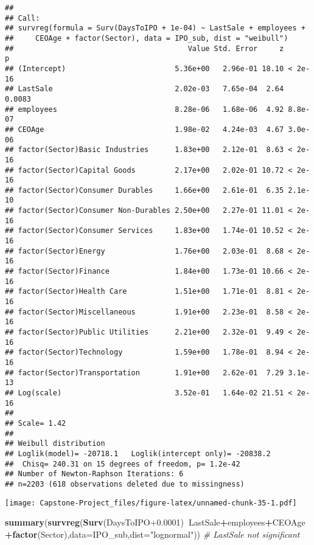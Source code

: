 \documentclass[]{article}
\newenvironment{Shaded}{\begin{snugshade}}{\end{snugshade}}
\newcommand{\CommentTok}[1]{\textcolor[rgb]{0.56,0.35,0.01}{\textit{#1}}}
\newcommand{\DataTypeTok}[1]{\textcolor[rgb]{0.13,0.29,0.53}{#1}}
\newcommand{\FloatTok}[1]{\textcolor[rgb]{0.00,0.00,0.81}{#1}}
\newcommand{\KeywordTok}[1]{\textcolor[rgb]{0.13,0.29,0.53}{\textbf{#1}}}
\newcommand{\NormalTok}[1]{#1}
\newcommand{\OperatorTok}[1]{\textcolor[rgb]{0.81,0.36,0.00}{\textbf{#1}}}
\newcommand{\StringTok}[1]{\textcolor[rgb]{0.31,0.60,0.02}{#1}}
\begin{document}
\begin{verbatim}
## 
## Call:
## survreg(formula = Surv(DaysToIPO + 1e-04) ~ LastSale + employees + 
##     CEOAge + factor(Sector), data = IPO_sub, dist = "weibull")
##                                        Value Std. Error     z       p
## (Intercept)                         5.36e+00   2.96e-01 18.10 < 2e-16
## LastSale                            2.02e-03   7.65e-04  2.64  0.0083
## employees                           8.28e-06   1.68e-06  4.92 8.8e-07
## CEOAge                              1.98e-02   4.24e-03  4.67 3.0e-06
## factor(Sector)Basic Industries      1.83e+00   2.12e-01  8.63 < 2e-16
## factor(Sector)Capital Goods         2.17e+00   2.02e-01 10.72 < 2e-16
## factor(Sector)Consumer Durables     1.66e+00   2.61e-01  6.35 2.1e-10
## factor(Sector)Consumer Non-Durables 2.50e+00   2.27e-01 11.01 < 2e-16
## factor(Sector)Consumer Services     1.83e+00   1.74e-01 10.52 < 2e-16
## factor(Sector)Energy                1.76e+00   2.03e-01  8.68 < 2e-16
## factor(Sector)Finance               1.84e+00   1.73e-01 10.66 < 2e-16
## factor(Sector)Health Care           1.51e+00   1.71e-01  8.81 < 2e-16
## factor(Sector)Miscellaneous         1.91e+00   2.23e-01  8.58 < 2e-16
## factor(Sector)Public Utilities      2.21e+00   2.32e-01  9.49 < 2e-16
## factor(Sector)Technology            1.59e+00   1.78e-01  8.94 < 2e-16
## factor(Sector)Transportation        1.91e+00   2.62e-01  7.29 3.1e-13
## Log(scale)                          3.52e-01   1.64e-02 21.51 < 2e-16
## 
## Scale= 1.42 
## 
## Weibull distribution
## Loglik(model)= -20718.1   Loglik(intercept only)= -20838.2
##  Chisq= 240.31 on 15 degrees of freedom, p= 1.2e-42 
## Number of Newton-Raphson Iterations: 6 
## n=2203 (618 observations deleted due to missingness)
\end{verbatim}

\texttt{[image: Capstone-Project\_files/figure-latex/unnamed-chunk-35-1.pdf]}

\begin{Shaded}
\begin{Highlighting}[]
\KeywordTok{summary}\NormalTok{(}\KeywordTok{survreg}\NormalTok{(}\KeywordTok{Surv}\NormalTok{(DaysToIPO}\FloatTok{+0.0001}\NormalTok{)}\OperatorTok{~}\NormalTok{LastSale}\OperatorTok{+}\NormalTok{employees}\OperatorTok{+}\NormalTok{CEOAge}\OperatorTok{+}\KeywordTok{factor}\NormalTok{(Sector),}\DataTypeTok{data=}\NormalTok{IPO_sub,}\DataTypeTok{dist=}\StringTok{"lognormal"}\NormalTok{)) }\CommentTok{# LastSale not significant}
\end{Highlighting}
\end{Shaded}
\end{document}
